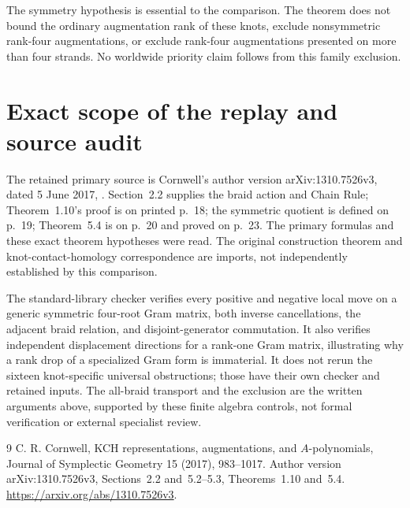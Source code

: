 \documentclass[11pt]{article}
\begin{document}
The symmetry hypothesis is essential to the comparison. The theorem
does not bound the ordinary augmentation rank of these knots, exclude
nonsymmetric rank-four augmentations, or exclude rank-four
augmentations presented on more than four strands. No worldwide
priority claim follows from this family exclusion.

\section{Exact scope of the replay and source audit}

The retained primary source is Cornwell's author version
arXiv:1310.7526v3, dated 5 June 2017,
.
Section~2.2 supplies the braid action and Chain Rule;
Theorem~1.10's proof is on printed p.~18; the symmetric quotient
is defined on p.~19; Theorem~5.4 is on p.~20 and proved on p.~23.
The primary formulas and these exact theorem hypotheses were read.
The original construction theorem and knot-contact-homology
correspondence are imports, not independently established by this
comparison.

The standard-library checker
 verifies every
positive and negative local move on a generic symmetric four-root
Gram matrix, both inverse cancellations, the adjacent braid relation,
and disjoint-generator commutation. It also verifies independent
displacement directions for a rank-one Gram matrix, illustrating
why a rank drop of a specialized Gram form is immaterial.
It does not rerun the sixteen knot-specific universal obstructions;
those have their own checker and retained inputs. The all-braid
transport and the exclusion are the written arguments above,
supported by these finite algebra controls, not formal verification
or external specialist review.

\begin{thebibliography}{9}
 C. R. Cornwell,
KCH representations, augmentations, and $A$-polynomials,
Journal of Symplectic Geometry 15 (2017), 983--1017.
Author version arXiv:1310.7526v3, Sections~2.2 and~5.2--5.3,
Theorems~1.10 and~5.4.
\url{https://arxiv.org/abs/1310.7526v3}.
\end{thebibliography}
\end{document}
